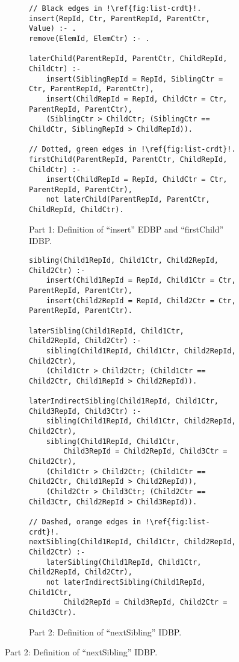 \begin{figure}[htpb]
	\centering

	\begin{subfigure}[b]{\textwidth}
		\begin{lstlisting}[keepspaces,escapechar=!]
// Black edges in !\ref{fig:list-crdt}!.
insert(RepId, Ctr, ParentRepId, ParentCtr, Value) :- .
remove(ElemId, ElemCtr) :- .

laterChild(ParentRepId, ParentCtr, ChildRepId, ChildCtr) :-
    insert(SiblingRepId = RepId, SiblingCtr = Ctr, ParentRepId, ParentCtr),
    insert(ChildRepId = RepId, ChildCtr = Ctr, ParentRepId, ParentCtr),
    (SiblingCtr > ChildCtr; (SiblingCtr == ChildCtr, SiblingRepId > ChildRepId)).

// Dotted, green edges in !\ref{fig:list-crdt}!.
firstChild(ParentRepId, ParentCtr, ChildRepId, ChildCtr) :-
    insert(ChildRepId = RepId, ChildCtr = Ctr, ParentRepId, ParentCtr),
    not laterChild(ParentRepId, ParentCtr, ChildRepId, ChildCtr).\end{lstlisting}
		\caption{Part 1: Definition of ``insert'' \ac{EDBP} and ``firstChild'' \ac{IDBP}.}\label{code:list-crdt-datalog-dialect-part1}
	\end{subfigure}

	\vspace{1em}

	\begin{subfigure}[b]{\textwidth}
		\begin{lstlisting}[keepspaces,escapechar=!]
sibling(Child1RepId, Child1Ctr, Child2RepId, Child2Ctr) :-
    insert(Child1RepId = RepId, Child1Ctr = Ctr, ParentRepId, ParentCtr),
    insert(Child2RepId = RepId, Child2Ctr = Ctr, ParentRepId, ParentCtr).

laterSibling(Child1RepId, Child1Ctr, Child2RepId, Child2Ctr) :-
    sibling(Child1RepId, Child1Ctr, Child2RepId, Child2Ctr),
    (Child1Ctr > Child2Ctr; (Child1Ctr == Child2Ctr, Child1RepId > Child2RepId)).

laterIndirectSibling(Child1RepId, Child1Ctr, Child3RepId, Child3Ctr) :-
    sibling(Child1RepId, Child1Ctr, Child2RepId, Child2Ctr),
    sibling(Child1RepId, Child1Ctr,
        Child3RepId = Child2RepId, Child3Ctr = Child2Ctr),
    (Child1Ctr > Child2Ctr; (Child1Ctr == Child2Ctr, Child1RepId > Child2RepId)),
    (Child2Ctr > Child3Ctr; (Child2Ctr == Child3Ctr, Child2RepId > Child3RepId)).

// Dashed, orange edges in !\ref{fig:list-crdt}!.
nextSibling(Child1RepId, Child1Ctr, Child2RepId, Child2Ctr) :-
    laterSibling(Child1RepId, Child1Ctr, Child2RepId, Child2Ctr),
    not laterIndirectSibling(Child1RepId, Child1Ctr,
        Child2RepId = Child3RepId, Child2Ctr = Child3Ctr).\end{lstlisting}
		\caption{Part 2: Definition of ``nextSibling'' \ac{IDBP}.}\label{code:list-crdt-datalog-dialect-part2}
	\end{subfigure}
\end{figure}


